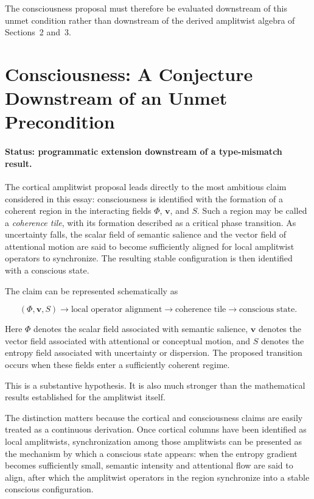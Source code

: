 \documentclass[11pt]{article}
\begin{document}
The consciousness proposal must therefore be evaluated downstream of this unmet condition rather than downstream of the derived amplitwist algebra of Sections~2 and~3.

\section{Consciousness: A Conjecture Downstream of an Unmet Precondition}

\paragraph{Status: programmatic extension downstream of a type-mismatch result.}

The cortical amplitwist proposal leads directly to the most ambitious claim considered in this essay: consciousness is identified with the formation of a coherent region in the interacting fields $\Phi$, $\mathbf v$, and $S$. Such a region may be called a \emph{coherence tile}, with its formation described as a critical phase transition. As uncertainty falls, the scalar field of semantic salience and the vector field of attentional motion are said to become sufficiently aligned for local amplitwist operators to synchronize. The resulting stable configuration is then identified with a conscious state.

The claim can be represented schematically as

\begin{equation}
(\Phi,\mathbf v,S)
\longrightarrow
\text{local operator alignment}
\longrightarrow
\text{coherence tile}
\longrightarrow
\text{conscious state}.
\end{equation}

Here $\Phi$ denotes the scalar field associated with semantic salience, $\mathbf v$ denotes the vector field associated with attentional or conceptual motion, and $S$ denotes the entropy field associated with uncertainty or dispersion. The proposed transition occurs when these fields enter a sufficiently coherent regime.

This is a substantive hypothesis. It is also much stronger than the mathematical results established for the amplitwist itself.

The distinction matters because the cortical and consciousness claims are easily treated as a continuous derivation. Once cortical columns have been identified as local amplitwists, synchronization among those amplitwists can be presented as the mechanism by which a conscious state appears: when the entropy gradient becomes sufficiently small, semantic intensity and attentional flow are said to align, after which the amplitwist operators in the region synchronize into a stable conscious configuration.
\end{document}

